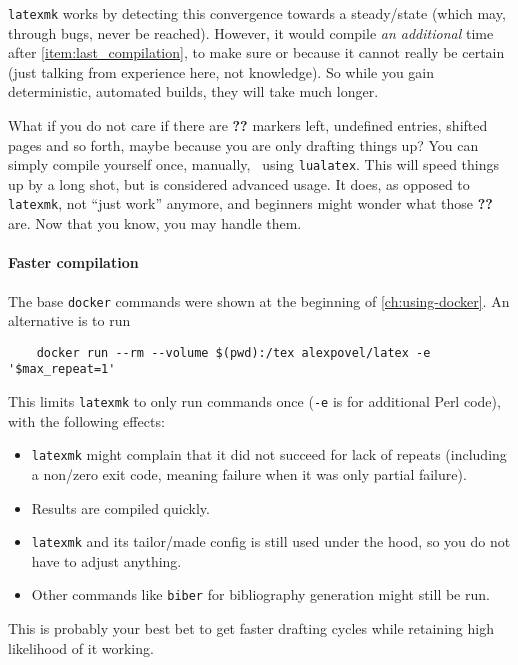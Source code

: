 \texttt{latexmk} works by detecting this convergence towards a steady\-/state (which may, through bugs, never be reached).
However, it would compile \emph{an additional} time after \cref{item:last_compilation}, to make sure or because it cannot really be certain (just talking from experience here, not knowledge).
So while you gain deterministic, automated builds, they will take much longer.

What if you do not care if there are \textbf{??} markers left, undefined entries, shifted pages and so forth, maybe because you are only drafting things up?
You can simply compile yourself once, manually, \ using \texttt{lualatex}.
This will speed things up by a long shot, but is considered advanced usage.
It does, as opposed to \texttt{latexmk}, not \enquote{just work} anymore, and beginners might wonder what those \textbf{??} are.
Now that you know, you may handle them.

\paragraph{Faster compilation}
The base \texttt{docker} commands were shown at the beginning of \cref{ch:using-docker}.
An alternative is to run
\begin{verbatim}
    docker run --rm --volume $(pwd):/tex alexpovel/latex -e '$max_repeat=1'
\end{verbatim}
This limits \texttt{latexmk} to only run commands once (\texttt{-e} is for additional Perl code), with the following effects:
\begin{itemize}
    \item \texttt{latexmk} might complain that it did not succeed for lack of repeats (including a non\-/zero exit code, meaning failure when it was only partial failure).
    \item Results are compiled quickly.
    \item \texttt{latexmk} and its tailor\-/made config is still used under the hood, so you do not have to adjust anything.
    \item Other commands like \texttt{biber} for bibliography generation might still be run.
\end{itemize}
This is probably your best bet to get faster drafting cycles while retaining high likelihood of it working.

